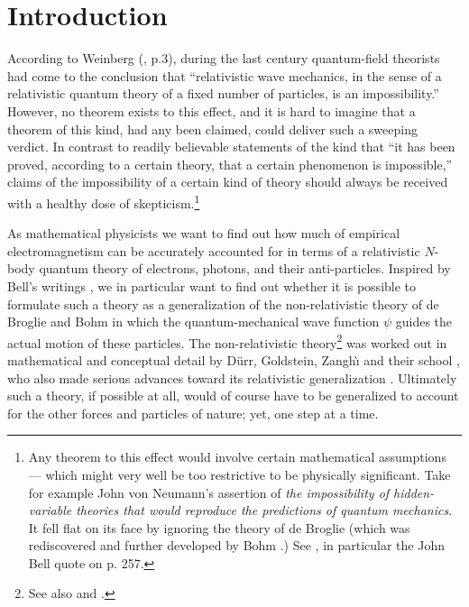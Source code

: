 \documentclass[11pt]{article}
\theoremstyle{definition}
\numberwithin{equation}{section}
\begin{document}
\medskip


\newpage

\section{Introduction} %

 According to Weinberg (\cite{WeinbergBOOKqft}, p.3), during the last century quantum-field theorists had come 
to the conclusion that ``relativistic wave mechanics, in the sense of a relativistic quantum theory of a fixed 
number of particles, is an impossibility.''
 However, no theorem exists to this effect, and it is hard to imagine that a theorem of this kind, had any been claimed, 
could deliver such a sweeping verdict.
 In contrast to readily believable statements of the kind that 
``it has been proved, according to a certain theory, that  a certain phenomenon is impossible,'' 
claims of the impossibility of a certain kind of theory should always be received with a healthy dose of skepticism.\footnote{Any 
  theorem to this effect would involve certain mathematical assumptions --- which 
  might very well be too restrictive to be physically significant.
     Take for example John von Neumann's assertion \cite{JvN} of \emph{the impossibility of hidden-variable theories that would reproduce 
  the predictions of quantum mechanics}. It fell flat on its face by ignoring the theory of de Broglie \cite{deBroglieSOLVAY} 
(which was rediscovered and further developed by Bohm \cite{Bohm52}.) 
See \cite{BricmontBOOK}, in particular the John Bell quote on p. 257.}
         
 As mathematical physicists we want to find out how much of empirical electromagnetism can be accurately accounted for in terms of 
a relativistic $N$-body quantum theory of electrons, photons, and their anti-particles.
 Inspired by Bell's writings \cite{BellBOOKsec}, we in particular want to find out whether it is possible to formulate
such a theory as a generalization of the non-relativistic theory of de Broglie \cite{deBroglieSOLVAY} and Bohm \cite{Bohm52}
in which the quantum-mechanical wave function $\psi$ guides the actual motion of these particles.
 The non-relativistic theory\footnote{See also \cite{BoHi} and \cite{HollandBOOK}.}
 was worked out in mathematical and conceptual detail by D\"urr, Goldstein, Zangh\`{\i} and their school \cite{DGZ,DT}, 
 who also made serious advances toward its relativistic generalization \cite{BerndlETal,DGNSZ}.
 Ultimately such a theory, if possible at all, would of course have to be generalized to account for the other forces and 
particles of nature; yet, one step at a time. 
\end{document}
